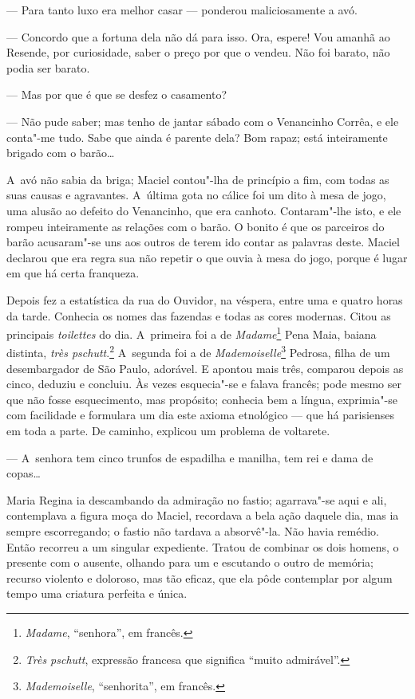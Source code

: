 \begin{linenumbers}
--- Para tanto luxo era melhor casar --- ponderou maliciosamente a avó.

--- Concordo que a fortuna dela não dá para isso. Ora, espere! Vou amanhã
ao Resende, por curiosidade, saber o preço por que o vendeu. Não foi
barato, não podia ser barato.

--- Mas por que é que se desfez o casamento?

--- Não pude saber; mas tenho de jantar sábado com o Venancinho Corrêa, e
ele conta"-me tudo. Sabe que ainda é parente dela? Bom rapaz; está
inteiramente brigado com o barão\ldots{}

A~avó não sabia da briga; Maciel contou"-lha de princípio a fim, com
todas as suas causas e agravantes. A~última gota no cálice foi um dito à
mesa de jogo, uma alusão ao defeito do Venancinho, que era canhoto.
Contaram"-lhe isto, e ele rompeu inteiramente as relações com o barão. O
bonito é que os parceiros do barão acusaram"-se uns aos outros de terem
ido contar as palavras deste. Maciel declarou que era regra sua não
repetir o que ouvia à mesa do jogo, porque é lugar em que há certa
franqueza.

Depois fez a estatística da rua do Ouvidor, na véspera, entre uma e
quatro horas da tarde. Conhecia os nomes das fazendas e todas as cores
modernas. Citou as principais \emph{toilettes} do dia. A~primeira foi a
de \emph{Madame}\footnote{\emph{Madame}, ``senhora'', em francês.} Pena
Maia, baiana distinta, \emph{très pschutt}.\footnote{\emph{Très pschutt},
  expressão francesa que significa ``muito admirável''.} A~segunda foi
a de \emph{Mademoiselle}\footnote{\emph{Mademoiselle}, ``senhorita'', em
  francês.} Pedrosa, filha de um desembargador de São Paulo, adorável. E
apontou mais três, comparou depois as cinco, deduziu e concluiu. Às
vezes esquecia"-se e falava francês; pode mesmo ser que não fosse
esquecimento, mas propósito; conhecia bem a língua, exprimia"-se com
facilidade e formulara um dia este axioma etnológico --- que há
parisienses em toda a parte. De caminho, explicou um problema de
voltarete.

--- A~senhora tem cinco trunfos de espadilha e manilha, tem rei e dama de
copas\ldots{}

Maria Regina ia descambando da admiração no fastio; agarrava"-se aqui e
ali, contemplava a figura moça do Maciel, recordava a bela ação daquele
dia, mas ia sempre escorregando; o fastio não tardava a absorvê"-la. Não
havia remédio. Então recorreu a um singular expediente. Tratou de
combinar os dois homens, o presente com o ausente, olhando para um e
escutando o outro de memória; recurso violento e doloroso, mas tão
eficaz, que ela pôde contemplar por algum tempo uma criatura perfeita e
única.


\end{linenumbers}
